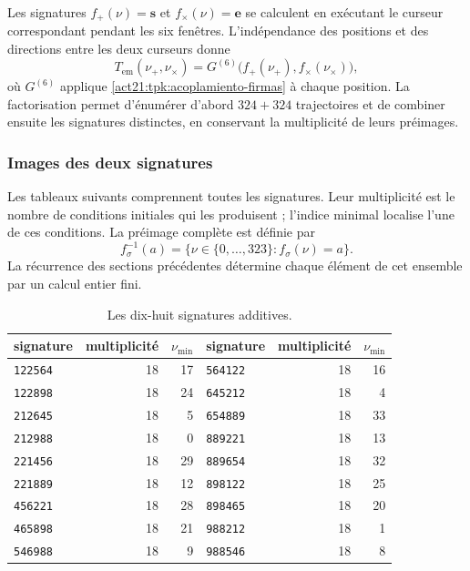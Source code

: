 Les signatures \(f_+(\nu)=\mathbf s\) et \(f_\times(\nu)=\mathbf e\) se
calculent en exécutant le curseur correspondant pendant les six fenêtres.
L'indépendance des positions et des directions entre les deux curseurs donne
\begin{equation}
 T_{\mathrm{em}}(\nu_+,\nu_\times)
   =G^{(6)}\bigl(f_+(\nu_+),f_\times(\nu_\times)\bigr),
 \label{act21:tpk:factorizacion}
\end{equation}
où \(G^{(6)}\) applique \eqref{act21:tpk:acoplamiento-firmas} à chaque position.
La factorisation permet d'énumérer d'abord \(324+324\) trajectoires et
de combiner ensuite les signatures distinctes, en conservant la multiplicité de
leurs préimages.

\par\noindent\begin{minipage}{\linewidth}
\subsubsection{Images des deux signatures}

Les tableaux suivants comprennent toutes les signatures. Leur multiplicité est le
nombre de conditions initiales qui les produisent ; l'indice minimal localise
l'une de ces conditions. La préimage complète est définie par
\[
 f_\sigma^{-1}(a)=\{\nu\in\{0,\ldots,323\}:f_\sigma(\nu)=a\}.
\]
La récurrence des sections précédentes détermine chaque élément de cet
ensemble par un calcul entier fini.

\begin{table}[H]
\centering\fontsize{9.5}{11.4}\selectfont
\setlength{\abovecaptionskip}{8pt}\setlength{\belowcaptionskip}{6pt}
\renewcommand{\arraystretch}{1.12}
\caption{Les dix-huit signatures additives.}
\label{act21:tpk:firmas-aditivas}
\begin{tabular}{@{}lrr@{\qquad}lrr@{}}
\toprule
signature&multiplicité&\(\nu_{\min}\)&signature&multiplicité&\(\nu_{\min}\)\\
\midrule
\texttt{122564}&18&17&\texttt{564122}&18&16\\
\texttt{122898}&18&24&\texttt{645212}&18&4\\
\texttt{212645}&18&5&\texttt{654889}&18&33\\
\texttt{212988}&18&0&\texttt{889221}&18&13\\
\texttt{221456}&18&29&\texttt{889654}&18&32\\
\texttt{221889}&18&12&\texttt{898122}&18&25\\
\texttt{456221}&18&28&\texttt{898465}&18&20\\
\texttt{465898}&18&21&\texttt{988212}&18&1\\
\texttt{546988}&18&9&\texttt{988546}&18&8\\
\bottomrule
\end{tabular}


\end{table}
\end{minipage}
